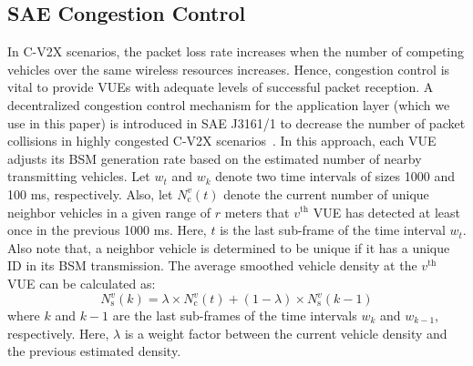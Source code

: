 \documentclass[conference]{IEEEtran}
\begin{document}
\subsection{SAE Congestion Control}\label{sec_sub_cc}
In C-V2X scenarios, the packet loss rate increases when the number of competing vehicles over the same wireless resources increases. Hence, congestion control is vital to provide VUEs with adequate levels of successful packet reception. A decentralized congestion control mechanism for the application layer (which we use in this paper) is introduced in SAE J3161/1 to decrease the number of packet collisions in highly congested C-V2X scenarios~\cite{J3161}. In this approach, each VUE adjusts its BSM generation rate based on the estimated number of nearby transmitting vehicles. Let $w_{t}$ and $w_{k}$ denote two time intervals of sizes 1000 and 100 ms, respectively. Also, let $N^{v}_{\mathrm{c}}{(t)}$ denote the current number of unique neighbor vehicles in a given range of $r$ meters that $v^{\mathrm{th}}$ VUE has detected at least once in the previous 1000 ms. Here, $t$ is the last sub-frame of the time interval $w_{t}$. Also note that, a neighbor vehicle is determined to be unique if it has a unique ID in its BSM transmission. The average smoothed vehicle density at the $v^{\mathrm{th}}$ VUE can be calculated as: 
\begin{equation}
    N_{\mathrm{s}}^{v}(k)=\lambda\times{N^{v}_{\mathrm{c}}(t)}+(1-\lambda)\times{N^{v}_{\mathrm{s}}(k-1)}
\end{equation}
where $k$ and $k-1$ are the last sub-frames of the time intervals $w_{k}$ and $w_{k-1}$, respectively. Here, $\lambda$ is a weight factor between the current vehicle density and the previous estimated density. 
\end{document}
